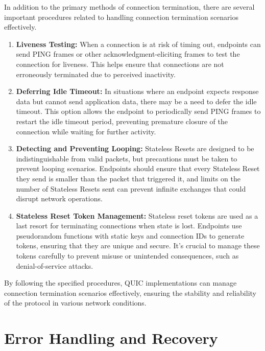 In addition to the primary methods of connection termination, there are several important procedures related to handling connection termination scenarios effectively.

\begingroup
\renewcommand\labelenumi{(\theenumi)}
\begin{enumerate}
\item \textbf{Liveness Testing:} When a connection is at risk of timing out, endpoints can send PING frames or other acknowledgment-eliciting frames to test the connection for liveness. This helps ensure that connections are not erroneously terminated due to perceived inactivity. \label{liveness_testing}
\item \textbf{Deferring Idle Timeout:} In situations where an endpoint expects response data but cannot send application data, there may be a need to defer the idle timeout. This option allows the endpoint to periodically send PING frames to restart the idle timeout period, preventing premature closure of the connection while waiting for further activity. \label{deferring_idle_timeout}
\item \textbf{Detecting and Preventing Looping:} Stateless Resets are designed to be indistinguishable from valid packets, but precautions must be taken to prevent looping scenarios. Endpoints should ensure that every Stateless Reset they send is smaller than the packet that triggered it, and limits on the number of Stateless Resets sent can prevent infinite exchanges that could disrupt network operations. \label{detecting_and_preventing_looping}
\item \textbf{Stateless Reset Token Management:} Stateless reset tokens are used as a last resort for terminating connections when
state is lost. Endpoints use pseudorandom functions with static keys and connection IDs to generate tokens, ensuring that they are unique and secure. It's crucial to manage these tokens carefully to prevent misuse or unintended consequences, such as denial-of-service attacks. \label{stateless_reset_token_management}
\end{enumerate}
\endgroup

By following the specified procedures, QUIC implementations can manage connection termination scenarios effectively, ensuring the stability and reliability of the protocol in various network conditions.

\section{Error Handling and Recovery} \label{error_handling_recovery}

